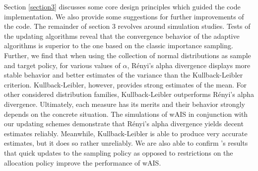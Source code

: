 \begin{multicols}{2}
\bigskip

Section \ref{section3} discusses some core design principles which guided the code implementation. We also provide some suggestions for further improvements of the code. 
The remainder of section 3 revolves around simulation studies. Tests of the updating algorithms reveal that the convergence behavior of the adaptive algorithms is superior to the one based on the classic importance sampling. Further, we find that when using the collection of normal distributions as sample and target policy, for various values of $\alpha$, Rényi's alpha divergence displays more stable behavior and better estimates of the variance than the Kullback-Leibler criterion. Kullback-Leibler, however, provides strong estimates of the mean. For other considered distribution families, Kullback-Leibler outperforms Rényi's alpha divergence. Ultimately, each measure has its merits and their behavior strongly depends on the concrete situation. The simulations of wAIS in conjunction with our updating schemes demonstrate that Rényi's alpha divergence yields decent estimates reliably.  Meanwhile, Kullback-Leibler is able to produce very accurate estimates, but it does so rather unreliably. We are also able to confirm \cite{portierdelyonWAIS}'s results that quick updates to the sampling policy as opposed to restrictions on the allocation policy improve the performance of wAIS. 

\largeskip

\largeskip

\pagebreak

\end{multicols}


